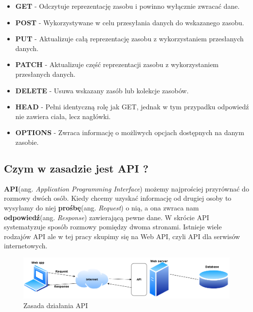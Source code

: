 \documentclass[oneside,polski,logo,indent]{amuthesis}
\begin{document}
\begin{itemize}
\item \textbf{GET} - Odczytuje reprezentację zasobu i powinno wyłącznie zwracać dane.
\item \textbf{POST} - Wykorzystywane w celu przesyłania danych do wskazanego zasobu.
\item \textbf{PUT} - Aktualizuje całą reprezentację zasobu z wykorzystaniem przesłanych danych.
\item \textbf{PATCH} - Aktualizuje część reprezentacji zasobu z wykorzystaniem przesłanych danych.
\item \textbf{DELETE} - Usuwa wskazany zasób lub kolekcje zasobów.
\item \textbf{HEAD} - Pełni identyczną rolę jak GET, jednak w tym przypadku odpowiedź nie zawiera ciała, lecz nagłówki.
\item \textbf{OPTIONS} - Zwraca informację o możliwych opcjach dostępnych na danym zasobie.
\end{itemize}

\begin{center}
\subsection{Czym w zasadzie jest API ?}
\end{center}
\textbf{API}(ang. \emph{Application Programming Interface}) możemy najprościej przyrównać do rozmowy dwóch osób. Kiedy chcemy uzyskać informację od drugiej osoby to wysyłamy do niej \textbf{prośbę}(ang. \emph{Request}) o nią, a ona zwraca nam \textbf{odpowiedź}(ang. \emph{Response}) zawierającą pewne dane. W skrócie API systematyzuje sposób rozmowy pomiędzy dwoma stronami. Istnieje wiele rodzajów API ale w tej pracy skupimy się na Web API, czyli API dla serwisów internetowych. 

\begin{figure}[H]
\centering
\includegraphics[width=14cm]{api.png}
\caption{Zasada działania API}
\label{Cache}
\end{figure}
\end{document}
